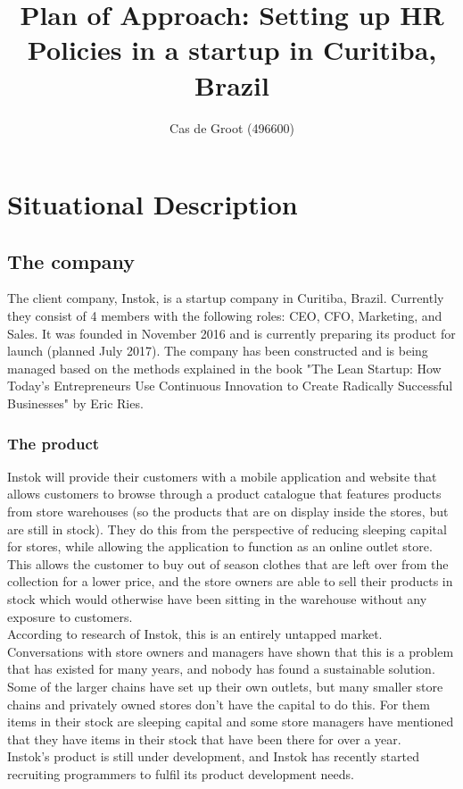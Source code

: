 \documentclass[man]{apa6}
\title{Plan of Approach: Setting up HR Policies in a startup in Curitiba, Brazil}
\author{Cas de Groot (496600)}
\affiliation{HAN University of Applied Sciences}
\begin{document}
\maketitle
\tableofcontents
\clearpage
\section{Situational Description}
\subsection{The company}
The client company, Instok, is a startup company in Curitiba, Brazil. Currently they consist of 4 members with the following roles: CEO, CFO, Marketing, and Sales. It was founded in November 2016 and is currently preparing its product for launch (planned July 2017). The company has been constructed and is being managed based on the methods explained in the book "The Lean Startup: How Today's Entrepreneurs Use Continuous Innovation to Create Radically Successful Businesses" by Eric Ries. 

\subsubsection{The product}
Instok will provide their customers with a mobile application and website that allows customers to browse through a product catalogue that features products from store warehouses (so the products that are on display inside the stores, but are still in stock). They do this from the perspective of reducing sleeping capital for stores, while allowing the application to function as an online outlet store. This allows the customer to buy out of season clothes that are left over from the collection for a lower price, and the store owners are able to sell their products in stock which would otherwise have been sitting in the warehouse without any exposure to customers.\\
According to research of Instok, this is an entirely untapped market. Conversations with store owners and managers have shown that this is a problem that has existed for many years, and nobody has found a sustainable solution. Some of the larger chains have set up their own outlets, but many smaller store chains and privately owned stores don't have the capital to do this. For them items in their stock are sleeping capital \parencite{SNELL2009} and some store managers have mentioned that they have items in their stock that have been there for over a year.\\
Instok's product is still under development, and Instok has recently started recruiting programmers to fulfil its product development needs. 
\end{document}
